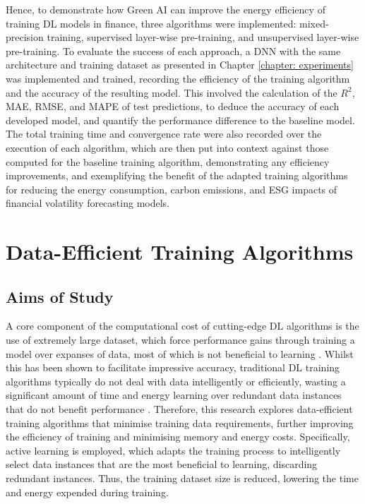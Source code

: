 \documentclass[a4paper, 11pt]{report}
\begin{document}
    Hence, to demonstrate how Green AI can improve the energy efficiency of training DL models in finance, three algorithms were implemented: mixed-precision training, supervised layer-wise pre-training, and unsupervised layer-wise pre-training. To evaluate the success of each approach, a DNN with the same architecture and training dataset as presented in Chapter \ref{chapter: experiments} was implemented and trained, recording the efficiency of the training algorithm and the accuracy of the resulting model. This involved the calculation of the $R^2$, MAE, RMSE, and MAPE of test predictions, to deduce the accuracy of each developed model, and quantify the performance difference to the baseline model. The total training time and convergence rate were also recorded over the execution of each algorithm, which are then put into context against those computed for the baseline training algorithm, demonstrating any efficiency improvements, and exemplifying the benefit of the adapted training algorithms for reducing the energy consumption, carbon emissions, and ESG impacts of financial volatility forecasting models.


    \chapter{Data-Efficient Training Algorithms}
    \label{chapter: data-extensions}

    \section{Aims of Study}

    A core component of the computational cost of cutting-edge DL algorithms is the use of extremely large dataset, which force performance gains through training a model over expanses of data, most of which is not beneficial to learning \citep{bender-2021}. Whilst this has been shown to facilitate impressive accuracy, traditional DL training algorithms typically do not deal with data intelligently or efficiently, wasting a significant amount of time and energy learning over redundant data instances that do not benefit performance \citep{aljarrah-2015}. Therefore, this research explores data-efficient training algorithms that minimise training data requirements, further improving the efficiency of training and minimising memory and energy costs. Specifically, active learning is employed, which adapts the training process to intelligently select data instances that are the most beneficial to learning, discarding redundant instances. Thus, the training dataset size is reduced, lowering the time and energy expended during training. 
\end{document}
